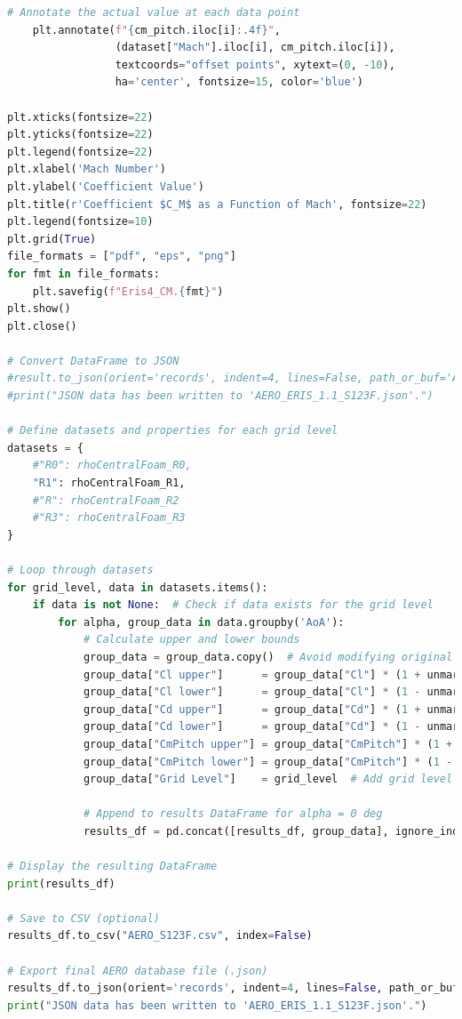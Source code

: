 \documentclass[12pt]{article}
\begin{document}
\begin{lstlisting}[language=Python, caption=Python script used to post-process numerical solutions. To report bugs email to: lorenzo.campoli@gspace.com, label=lst:pp]
   # Annotate the actual value at each data point
    plt.annotate(f"{cm_pitch.iloc[i]:.4f}", 
                 (dataset["Mach"].iloc[i], cm_pitch.iloc[i]), 
                 textcoords="offset points", xytext=(0, -10),
                 ha='center', fontsize=15, color='blue')
    
plt.xticks(fontsize=22)
plt.yticks(fontsize=22)
plt.legend(fontsize=22)
plt.xlabel('Mach Number')
plt.ylabel('Coefficient Value')
plt.title(r'Coefficient $C_M$ as a Function of Mach', fontsize=22)
plt.legend(fontsize=10)
plt.grid(True)
file_formats = ["pdf", "eps", "png"]
for fmt in file_formats:
    plt.savefig(f"Eris4_CM.{fmt}")
plt.show()
plt.close()

# Convert DataFrame to JSON
#result.to_json(orient='records', indent=4, lines=False, path_or_buf='AERO_ERIS_1.1_S123F.json')
#print("JSON data has been written to 'AERO_ERIS_1.1_S123F.json'.")

# Define datasets and properties for each grid level
datasets = {
    #"R0": rhoCentralFoam_R0,
    "R1": rhoCentralFoam_R1,
    #"R": rhoCentralFoam_R2
    #"R3": rhoCentralFoam_R3
}

# Loop through datasets
for grid_level, data in datasets.items():
    if data is not None:  # Check if data exists for the grid level
        for alpha, group_data in data.groupby('AoA'):
            # Calculate upper and lower bounds
            group_data = group_data.copy()  # Avoid modifying original DataFrame
            group_data["Cl upper"]      = group_data["Cl"] * (1 + unmargin)
            group_data["Cl lower"]      = group_data["Cl"] * (1 - unmargin)
            group_data["Cd upper"]      = group_data["Cd"] * (1 + unmargin)
            group_data["Cd lower"]      = group_data["Cd"] * (1 - unmargin)
            group_data["CmPitch upper"] = group_data["CmPitch"] * (1 + unmargin)
            group_data["CmPitch lower"] = group_data["CmPitch"] * (1 - unmargin)
            group_data["Grid Level"]    = grid_level  # Add grid level as a column

            # Append to results DataFrame for alpha = 0 deg
            results_df = pd.concat([results_df, group_data], ignore_index=True)

# Display the resulting DataFrame
print(results_df)

# Save to CSV (optional)
results_df.to_csv("AERO_S123F.csv", index=False)

# Export final AERO database file (.json)
results_df.to_json(orient='records', indent=4, lines=False, path_or_buf='AERO_ERIS_1.1_S123F.json')
print("JSON data has been written to 'AERO_ERIS_1.1_S123F.json'.")
\end{lstlisting}
\end{document}

